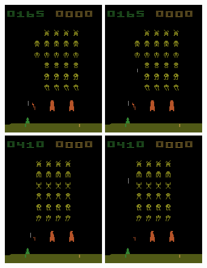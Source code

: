 \begin{figure}
\begin{multicols}{3}
    \includegraphics[scale=0.8]{figures/related_work/space_invaders_831_rgb_odd.png}\par
    \includegraphics[scale=0.8]{figures/related_work/space_invaders_831_rgb_maximum_of_even_odd.png}\par
\end{multicols}
\begin{multicols}{3}
    \includegraphics[scale=0.8]{figures/related_work/space_invaders_1044_rgb_even.png}\par
    \includegraphics[scale=0.8]{figures/related_work/space_invaders_1044_rgb_odd.png}\par

\end{multicols}
\end{figure}
